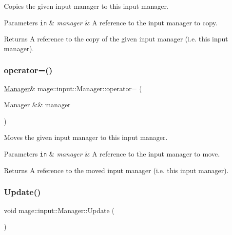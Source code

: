 Copies the given input manager to this input manager.


\begin{DoxyParams}[1]{Parameters}
\mbox{\tt in}  & {\em manager} & A reference to the input manager to copy. \\
\hline
\end{DoxyParams}
\begin{DoxyReturn}{Returns}
A reference to the copy of the given input manager (i.\+e. this input manager). 
\end{DoxyReturn}
\mbox{\label{classmage_1_1input_1_1_manager_a09047a5d857027368bc731763f8b5ece}} 
\subsubsection{\texorpdfstring{operator=()}{operator=()}\hspace{0.1cm}{\footnotesize\ttfamily [2/2]}}
{\footnotesize\ttfamily \mbox{\hyperlink{classmage_1_1input_1_1_manager}{Manager}}\& mage\+::input\+::\+Manager\+::operator= (\begin{DoxyParamCaption}\item[{\mbox{\hyperlink{classmage_1_1input_1_1_manager}{Manager}} \&\&}]{manager }\end{DoxyParamCaption})\hspace{0.3cm}{\ttfamily [delete]}}

Moves the given input manager to this input manager.


\begin{DoxyParams}[1]{Parameters}
\mbox{\tt in}  & {\em manager} & A reference to the input manager to move. \\
\hline
\end{DoxyParams}
\begin{DoxyReturn}{Returns}
A reference to the moved input manager (i.\+e. this input manager). 
\end{DoxyReturn}
\mbox{\label{classmage_1_1input_1_1_manager_a89934adcb3da215d5162bd0d30e48a9d}} 
\subsubsection{\texorpdfstring{Update()}{Update()}}
{\footnotesize\ttfamily void mage\+::input\+::\+Manager\+::\+Update (\begin{DoxyParamCaption}{ }\end{DoxyParamCaption})\hspace{0.3cm}{\ttfamily [noexcept]}}

